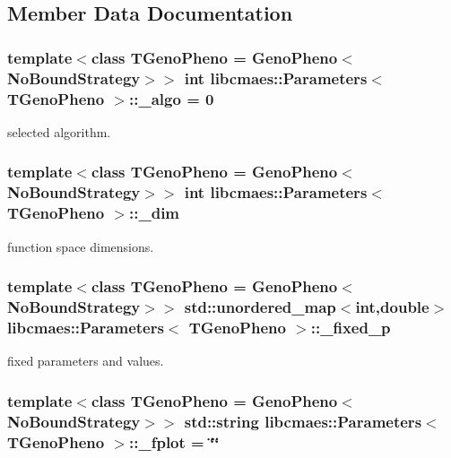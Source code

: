 \subsection{Member Data Documentation}
\hypertarget{classlibcmaes_1_1Parameters_a7a5fc681b0c7294ef050ace344f923db}{
\subsubsection[{\-\_\-algo}]{\setlength{\rightskip}{0pt plus 5cm}template$<$class T\-Geno\-Pheno = Geno\-Pheno$<$\-No\-Bound\-Strategy$>$$>$ int {\bf libcmaes\-::\-Parameters}$<$ T\-Geno\-Pheno $>$\-::\-\_\-algo = 0}}\label{classlibcmaes_1_1Parameters_a7a5fc681b0c7294ef050ace344f923db}
selected algorithm. \hypertarget{classlibcmaes_1_1Parameters_affc62ae5c5f1db4f88e4c2dc96387af6}{
\subsubsection[{\-\_\-dim}]{\setlength{\rightskip}{0pt plus 5cm}template$<$class T\-Geno\-Pheno = Geno\-Pheno$<$\-No\-Bound\-Strategy$>$$>$ int {\bf libcmaes\-::\-Parameters}$<$ T\-Geno\-Pheno $>$\-::\-\_\-dim}}\label{classlibcmaes_1_1Parameters_affc62ae5c5f1db4f88e4c2dc96387af6}
function space dimensions. \hypertarget{classlibcmaes_1_1Parameters_a83fdae9d4bb9b77c8ad955c6aac75086}{
\subsubsection[{\-\_\-fixed\-\_\-p}]{\setlength{\rightskip}{0pt plus 5cm}template$<$class T\-Geno\-Pheno = Geno\-Pheno$<$\-No\-Bound\-Strategy$>$$>$ std\-::unordered\-\_\-map$<$int,double$>$ {\bf libcmaes\-::\-Parameters}$<$ T\-Geno\-Pheno $>$\-::\-\_\-fixed\-\_\-p}}\label{classlibcmaes_1_1Parameters_a83fdae9d4bb9b77c8ad955c6aac75086}
fixed parameters and values. \hypertarget{classlibcmaes_1_1Parameters_aa49511ea00199348ea94f1aa53fe5bc1}{
\subsubsection[{\-\_\-fplot}]{\setlength{\rightskip}{0pt plus 5cm}template$<$class T\-Geno\-Pheno = Geno\-Pheno$<$\-No\-Bound\-Strategy$>$$>$ std\-::string {\bf libcmaes\-::\-Parameters}$<$ T\-Geno\-Pheno $>$\-::\-\_\-fplot = \char`\"{}\char`\"{}}}\label{classlibcmaes_1_1Parameters_aa49511ea00199348ea94f1aa53fe5bc1}
